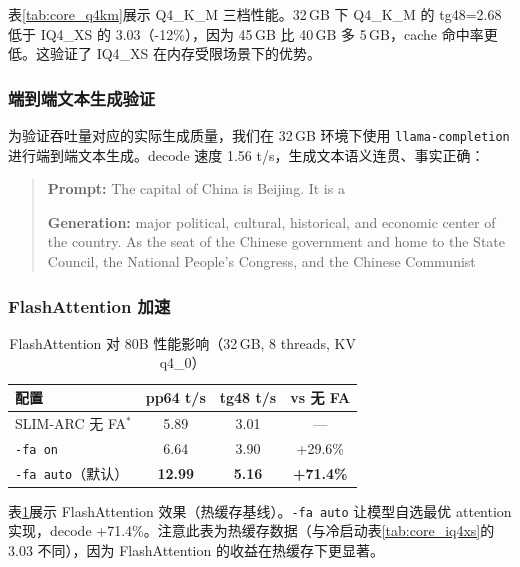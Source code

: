 表\ref{tab:core_q4km}展示 Q4\_K\_M 三档性能。32\,GB 下 Q4\_K\_M 的 tg48=2.68 低于 IQ4\_XS 的 3.03（-12\%），因为 45\,GB 比 40\,GB 多 5\,GB，cache 命中率更低。这验证了 IQ4\_XS 在内存受限场景下的优势。

\subsubsection{端到端文本生成验证}

为验证吞吐量对应的实际生成质量，我们在 32\,GB 环境下使用 \texttt{llama-completion} 进行端到端文本生成。decode 速度 1.56 t/s，生成文本语义连贯、事实正确：

\begin{quote}
\small\ttfamily
\textbf{Prompt:} The capital of China is Beijing. It is a

\textbf{Generation:} major political, cultural, historical, and economic center of the country. As the seat of the Chinese government and home to the State Council, the National People's Congress, and the Chinese Communist
\end{quote}

\subsubsection{FlashAttention 加速}

\begin{table}[H]
    \centering
    \caption{FlashAttention 对 80B 性能影响（32\,GB, 8 threads, KV q4\_0）}
    \label{tab:eval_flashattn}
    \begin{tabular}{lccc}
        \toprule
        \textbf{配置} & \textbf{pp64 t/s} & \textbf{tg48 t/s} & \textbf{vs 无 FA} \\
        \midrule
        SLIM-ARC 无 FA$^*$ & 5.89 & 3.01 & --- \\
        \texttt{-fa on} & 6.64 & 3.90 & +29.6\% \\
        \texttt{-fa auto}（默认） & \textbf{12.99} & \textbf{5.16} & \textbf{+71.4\%} \\
        \bottomrule
    \end{tabular}
\end{table}


表\ref{tab:eval_flashattn}展示 FlashAttention 效果（热缓存基线）。\texttt{-fa auto} 让模型自选最优 attention 实现，decode +71.4\%。注意此表为热缓存数据（与冷启动表\ref{tab:core_iq4xs}的 3.03 不同），因为 FlashAttention 的收益在热缓存下更显著。


